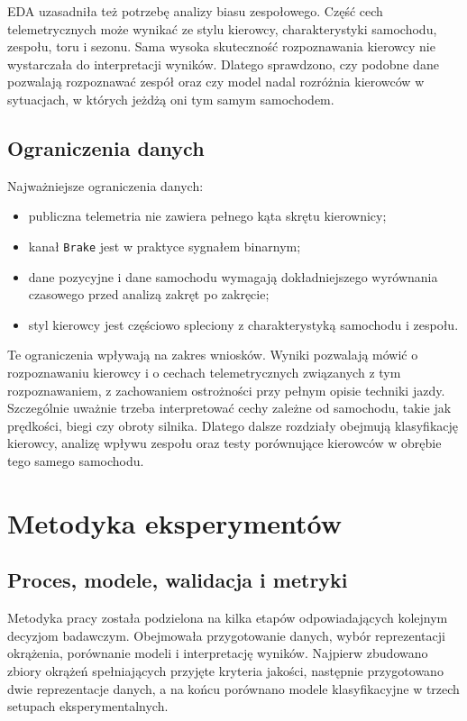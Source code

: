 \documentclass[printmode,pl]{mgr}
\begin{document}
EDA uzasadniła też potrzebę analizy biasu zespołowego. Część cech telemetrycznych może wynikać ze stylu kierowcy, charakterystyki samochodu, zespołu, toru i sezonu. Sama wysoka skuteczność rozpoznawania kierowcy nie wystarczała do interpretacji wyników. Dlatego sprawdzono, czy podobne dane pozwalają rozpoznawać zespół oraz czy model nadal rozróżnia kierowców w sytuacjach, w których jeżdżą oni tym samym samochodem.

\section{Ograniczenia danych}

Najważniejsze ograniczenia danych:

\begin{itemize}
    \item publiczna telemetria nie zawiera pełnego kąta skrętu kierownicy;
    \item kanał \texttt{Brake} jest w praktyce sygnałem binarnym;
    \item dane pozycyjne i dane samochodu wymagają dokładniejszego wyrównania czasowego przed analizą zakręt po zakręcie;
    \item styl kierowcy jest częściowo spleciony z charakterystyką samochodu i zespołu.
\end{itemize}

Te ograniczenia wpływają na zakres wniosków. Wyniki pozwalają mówić o rozpoznawaniu kierowcy i o cechach telemetrycznych związanych z tym rozpoznawaniem, z zachowaniem ostrożności przy pełnym opisie techniki jazdy. Szczególnie uważnie trzeba interpretować cechy zależne od samochodu, takie jak prędkości, biegi czy obroty silnika. Dlatego dalsze rozdziały obejmują klasyfikację kierowcy, analizę wpływu zespołu oraz testy porównujące kierowców w obrębie tego samego samochodu.

\chapter{Metodyka eksperymentów}

\section{Proces, modele, walidacja i metryki}

Metodyka pracy została podzielona na kilka etapów odpowiadających kolejnym decyzjom badawczym. Obejmowała przygotowanie danych, wybór reprezentacji okrążenia, porównanie modeli i interpretację wyników. Najpierw zbudowano zbiory okrążeń spełniających przyjęte kryteria jakości, następnie przygotowano dwie reprezentacje danych, a na końcu porównano modele klasyfikacyjne w trzech setupach eksperymentalnych.
\end{document}
